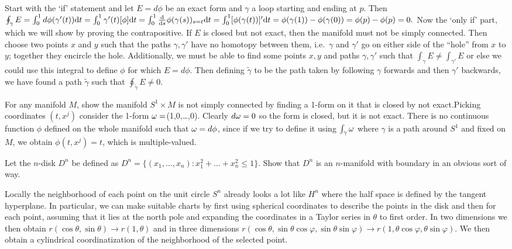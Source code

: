 \documentclass[a4paper,12pt]{report}
\numberwithin{equation}{section}
\begin{document}
{Start with the `if' statement and let $E=d\phi$ be an exact form and $\gamma$ a loop starting and ending at $p$. Then 
$\oint_\gamma E=\int_0^1 d\phi(\gamma'(t)){\rm d}t=\int_0^1\gamma'(t)[\phi]{\rm d}t=\int_0^1\frac{\rm d}{{\rm d}s}\phi(\gamma(s))_{s=t}{\rm d}t=\int_0^1[\phi(\gamma(t))]'{\rm d}t=\phi(\gamma(1))-\phi(\gamma(0))=\phi(p)-\phi(p)=0.$
Now the `only if' part, which we will show by proving the contrapositive.
If $E$ is closed but not exact, then the manifold must not be simply connected. Then choose two points $x$ and $y$ such that the paths $\gamma,\gamma'$ have no homotopy between them, i.e.~$\gamma$ and $\gamma'$ go on either side of the ``hole'' from $x$ to $y$; together they encircle the hole. Additionally, we must be able to
find some points $x,y$ and paths $\gamma,\gamma'$ such that $\int_\gamma E\neq \int_{\gamma'}E$ or else we could use this integral to define $\phi$ for which $E=d\phi$. 
Then defining $\tilde{\gamma}$ to be the path taken by following $\gamma$ forwards and then $\gamma'$ backwards, we have found a path $\tilde{\gamma}$ such that  $\oint_{\tilde{\gamma}} E\neq 0$.}

\begin{p}%
{For any manifold $M$, show the manifold $S^1\times M$ is not simply connected by finding a 1-form on it that is closed by not exact.}{Picking coordinates $(t,x^j)$ consider the 1-form $\omega=$(1,0,\dots,0). Clearly $d\omega=0$ so the form is
closed, but it is not exact. There is no continuous function $\phi$ defined on the whole manifold such that $\omega=d\phi$, since if we try to define it using $\int_\gamma \omega$ where
$\gamma$ is a path around $S^1$ and fixed on $M$, we obtain $\phi(t,x^j)=t$, which is multiple-valued.}
\end{p}

\begin{p}%
{Let the $n$-disk $D^n$ be defined as $D^n=\{(x_1,\dots,x_n):x_1^2+\dots+x_n^2\leq 1\}$. Show that $D^n$ is an $n$-manifold with
boundary in an obvious sort of way.}
\end{p}
{Locally the neighborhood of each point on the unit circle $S^n$ already looks a lot like $H^{n}$ where the half space is defined by the tangent hyperplane. In particular, we can make
suitable charts by first using spherical coordinates to describe the points in the disk and then for each point,
assuming that it lies at the north pole and expanding the coordinates in a Taylor series in $\theta$ to first order. In two dimensions we then obtain $r(\cos \theta,\sin\theta)\rightarrow r(1,\theta)$ and in three dimensions
$r(\cos\theta,\sin\theta\cos\varphi,\sin\theta\sin\varphi)\rightarrow r(1,\theta\cos\varphi,\theta\sin\varphi)$. We then obtain a cylindrical coordinatization of the neighborhood of the selected point.}
\end{document}

